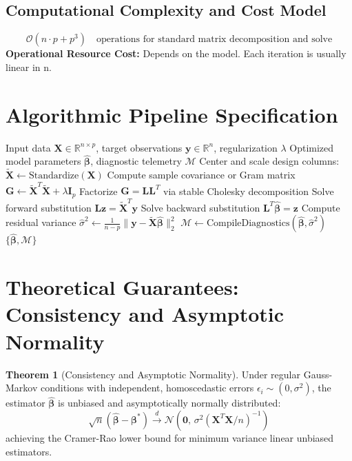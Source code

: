\documentclass[11pt,a4paper]{article}
\theoremstyle{definition}
\newtheorem{theorem}{\textbf{Theorem}}[section]
\begin{document}
\subsection{Computational Complexity and Cost Model}
\begin{equation}
\mathcal{O}(n \cdot p + p^3) \quad \text{operations for standard matrix decomposition and solve}
\end{equation}
\textbf{Operational Resource Cost:} Depends on the model. Each iteration is usually linear in n.

\section{Algorithmic Pipeline Specification}

\begin{algorithm}[H]
\caption{The expectation-maximization Execution}
\begin{algorithmic}[1]
\Require Input data $\mathbf{X} \in \mathbb{R}^{n \times p}$, target observations $\mathbf{y} \in \mathbb{R}^n$, regularization $\lambda$
\Ensure Optimized model parameters $\hat{\boldsymbol{\beta}}$, diagnostic telemetry $\mathcal{M}$
\State Center and scale design columns: $\tilde{\mathbf{X}} \gets \text{Standardize}(\mathbf{X})$
\State Compute sample covariance or Gram matrix $\mathbf{G} \gets \tilde{\mathbf{X}}^T \tilde{\mathbf{X}} + \lambda \mathbf{I}_p$
\State Factorize $\mathbf{G} = \mathbf{L} \mathbf{L}^T$ via stable Cholesky decomposition
\State Solve forward substitution $\mathbf{L} \mathbf{z} = \tilde{\mathbf{X}}^T \mathbf{y}$
\State Solve backward substitution $\mathbf{L}^T \hat{\boldsymbol{\beta}} = \mathbf{z}$
\State Compute residual variance $\hat{\sigma}^2 \gets \frac{1}{n - p} \| \mathbf{y} - \tilde{\mathbf{X}} \hat{\boldsymbol{\beta}} \|_2^2$
\State $\mathcal{M} \gets \text{CompileDiagnostics}(\hat{\boldsymbol{\beta}}, \hat{\sigma}^2)$
\State \Return $\{\hat{\boldsymbol{\beta}}, \mathcal{M}\}$
\end{algorithmic}
\end{algorithm}

\section{Theoretical Guarantees: Consistency and Asymptotic Normality}

\begin{theorem}[Consistency and Asymptotic Normality]
Under regular Gauss-Markov conditions with independent, homoscedastic errors $\epsilon_i \sim (0, \sigma^2)$, the estimator $\hat{\boldsymbol{\beta}}$ is unbiased and asymptotically normally distributed:
\begin{equation}
\sqrt{n}(\hat{\boldsymbol{\beta}} - \boldsymbol{\beta}^*) \xrightarrow{d} \mathcal{N}\left(\mathbf{0}, \, \sigma^2 (\mathbf{X}^T \mathbf{X} / n)^{-1}\right)
\end{equation}
achieving the Cramer-Rao lower bound for minimum variance linear unbiased estimators.
\end{theorem}
\end{document}
